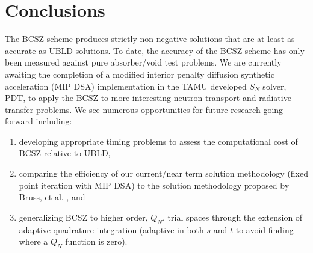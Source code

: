 \documentclass{mc2015}
\begin{document}
\section{Conclusions}
\label{sec:conclusions}
The BCSZ scheme produces strictly non-negative solutions that are at least as accurate as UBLD solutions.
To date, the accuracy of the BCSZ scheme has only been measured against pure absorber/void test problems.  
We are currently awaiting the completion of a modified interior penalty  diffusion synthetic acceleration (MIP DSA) \cite{hackemack} implementation in the TAMU developed $S_N$ solver, PDT\cite{pdt}, to apply the BCSZ to more interesting neutron transport and radiative transfer problems.
We see numerous opportunities for future research going forward including:
\begin{enumerate}
\item developing appropriate timing problems to assess the computational cost of BCSZ relative to UBLD,
\item comparing the efficiency of our current/near term solution methodology (fixed point iteration with MIP DSA) to the solution methodology proposed by Bruss, et al. \cite{csz_don}, and
\item generalizing BCSZ to higher order, $Q_N$, trial spaces through the extension of adaptive quadrature integration (adaptive in both $s$ and $t$ to avoid finding where a $Q_N$ function is zero).
\end{enumerate}



\end{document}
